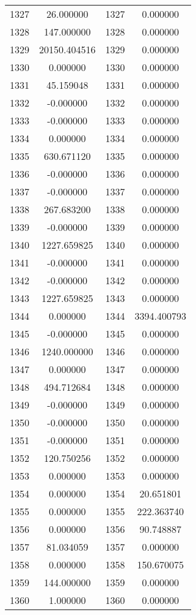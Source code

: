 \documentclass[12pt]{article}
\begin{document}
\begin{longtable}{@{}cccc@{}}
1327 & 26.000000 & 1327 & 0.000000 \\
1328 & 147.000000 & 1328 & 0.000000 \\
1329 & 20150.404516 & 1329 & 0.000000 \\
1330 & 0.000000 & 1330 & 0.000000 \\
1331 & 45.159048 & 1331 & 0.000000 \\
1332 & -0.000000 & 1332 & 0.000000 \\
1333 & -0.000000 & 1333 & 0.000000 \\
1334 & 0.000000 & 1334 & 0.000000 \\
1335 & 630.671120 & 1335 & 0.000000 \\
1336 & -0.000000 & 1336 & 0.000000 \\
1337 & -0.000000 & 1337 & 0.000000 \\
1338 & 267.683200 & 1338 & 0.000000 \\
1339 & -0.000000 & 1339 & 0.000000 \\
1340 & 1227.659825 & 1340 & 0.000000 \\
1341 & -0.000000 & 1341 & 0.000000 \\
1342 & -0.000000 & 1342 & 0.000000 \\
1343 & 1227.659825 & 1343 & 0.000000 \\
1344 & 0.000000 & 1344 & 3394.400793 \\
1345 & -0.000000 & 1345 & 0.000000 \\
1346 & 1240.000000 & 1346 & 0.000000 \\
1347 & 0.000000 & 1347 & 0.000000 \\
1348 & 494.712684 & 1348 & 0.000000 \\
1349 & -0.000000 & 1349 & 0.000000 \\
1350 & -0.000000 & 1350 & 0.000000 \\
1351 & -0.000000 & 1351 & 0.000000 \\
1352 & 120.750256 & 1352 & 0.000000 \\
1353 & 0.000000 & 1353 & 0.000000 \\
1354 & 0.000000 & 1354 & 20.651801 \\
1355 & 0.000000 & 1355 & 222.363740 \\
1356 & 0.000000 & 1356 & 90.748887 \\
1357 & 81.034059 & 1357 & 0.000000 \\
1358 & 0.000000 & 1358 & 150.670075 \\
1359 & 144.000000 & 1359 & 0.000000 \\
1360 & 1.000000 & 1360 & 0.000000 \\

\end{longtable}
\end{document}

